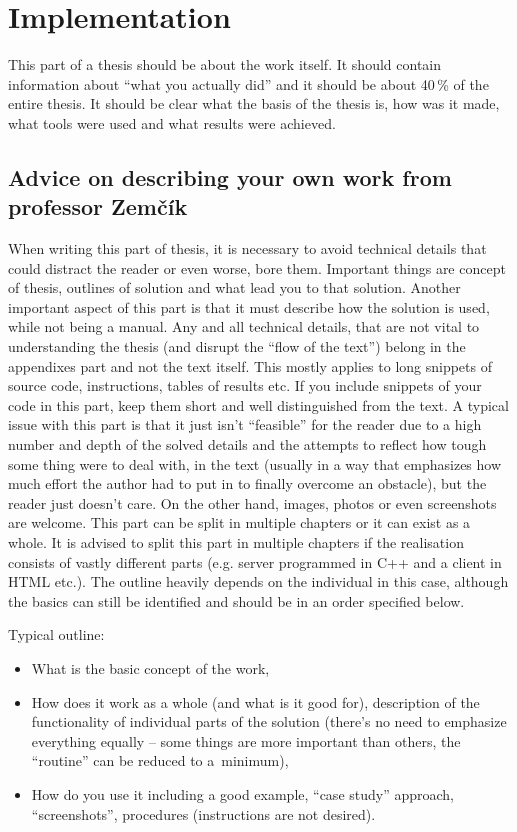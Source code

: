 {{\section{Implementation}
\label{implementace}

This part of a thesis should be about the work itself. It should contain information about ``what you actually did'' and it should be about 40\,\% of the entire thesis. It should be clear what the basis of the thesis is, how was it made, what tools were used and what results were achieved.

\subsection*{Advice on describing your own work from professor Zemčík}

When writing this part of thesis, it is necessary to avoid technical details that could distract the reader or even worse, bore them. Important things are concept of thesis, outlines of solution and what lead you to that solution.
Another important aspect of this part is that it must describe how the solution is used, while not being a manual.
Any and all technical details, that are not vital to understanding the thesis (and disrupt the ``flow of the text'') belong in the appendixes part and not the text itself. This mostly applies to long snippets of source code, instructions, tables of results etc. If you include snippets of your code in this part, keep them short and well distinguished from the text. A typical issue with this part is that it just isn't ``feasible'' for the reader due to a high number and depth of the solved details and the attempts to reflect how tough some thing were to deal with, in the text (usually in a way that emphasizes how much effort the author had to put in to finally overcome an obstacle), but the reader just doesn't care. On the other hand, images, photos or even screenshots are welcome. This part can be split in multiple chapters or it can exist as a whole. It is advised to split this part in multiple chapters if the realisation consists of vastly different parts (e.g. server programmed in C++ and a client in HTML etc.). The outline heavily depends on the individual in this case, although the basics can still be identified and should be in an order specified below.
\bigskip

\begin{samepage}
\noindent Typical outline:
\begin{itemize}
  \item{What is the basic concept of the work,}
  \item{How does it work as a whole (and what is it good for), description of the functionality of individual parts of the solution (there's no need to emphasize everything equally -- some things are more important than others, the ``routine'' can be reduced to a~minimum),}
  \item{How do you use it including a good example, ``case study'' approach, ``screenshots'', procedures (instructions are not desired).}
\end{itemize}
\end{samepage}


}}
